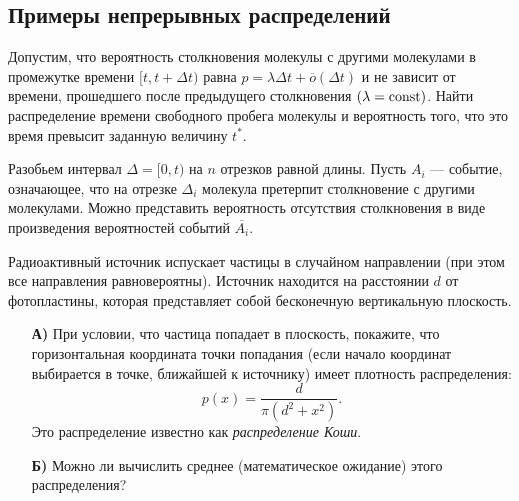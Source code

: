 
\subsection{Примеры непрерывных распределений}

\begin{problem}
Допустим, что вероятность столкновения молекулы с другими молекулами в промежутке времени $[t,t + \Delta t)$ 
равна $p = \lambda\Delta t+{\overline o}(\Delta t)$ и не зависит от времени, прошедшего после предыдущего столкновения $(\lambda = \mathop{\mathrm{const}}\nolimits)$. 
Найти распределение времени свободного пробега молекулы и вероятность того, что это время превысит заданную величину $t^*$. 
\end{problem}

\begin{ordre}
Разобьем интервал $\Delta=[0,t)$ на $n$ отрезков равной длины.
Пусть $A_i$ --- событие, означающее, что на отрезке $\Delta_i$  молекула претерпит столкновение с другими молекулами. Можно представить вероятность отсутствия столкновения в виде произведения вероятностей событий $\overline{A_i}$.
\end{ordre}


\begin{problem}
Радиоактивный источник испускает 
частицы в случайном направлении (при этом все направления равновероятны). 
Источник находится на расстоянии $d$ от фотопластины, которая представляет 
собой бесконечную вертикальную плоскость.

\begin{enumerate}
\item[\textbf{А)}] При условии, что частица попадает в плоскость, покажите, что 
горизонтальная координата точки попадания (если начало координат выбирается 
в точке, ближайшей к источнику) имеет плотность распределения:
\[
p\left( x \right)=\frac{d}{\pi \left( {d^2+x^2} \right)}.
\]
Это распределение известно как \textit{распределение Коши}.

\item[\textbf{Б)}] Можно ли вычислить среднее (математическое ожидание) этого 
распределения?
\end{enumerate}
\end{problem}
